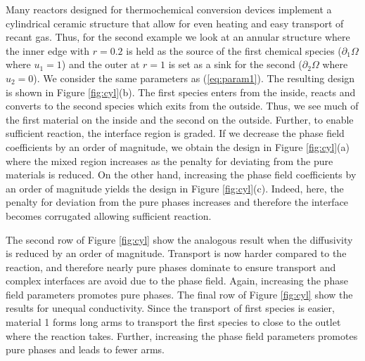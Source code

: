 \documentclass[11pt]{article}
\begin{document}
Many reactors designed for thermochemical conversion devices implement a cylindrical ceramic structure that allow for even heating and easy transport of recant gas. Thus, for the second example we look at an annular structure where the inner edge with $r=0.2$ is held as the source of the first chemical species ($\partial_1 \Omega$ where $u_1=1$) and the outer at $r=1$ is set as a sink for the second  ($\partial_2 \Omega$ where $u_2=0$).  We consider the same parameters as (\ref{eq:param1}). The resulting design is shown in Figure \ref{fig:cyl}(b). The first species enters from the inside, reacts and converts to the second species which exits from the outside. Thus, we see much of the first material on the inside and the second on the outside. Further, to enable sufficient reaction, the interface region is graded.  If we decrease the phase field coefficients by an order of magnitude, we obtain the design in Figure \ref{fig:cyl}(a) where the mixed region increases as the penalty for deviating from the pure materials is reduced. On the other hand, increasing the phase field coefficients by an order of magnitude yields the design in Figure \ref{fig:cyl}(c). Indeed, here, the penalty for deviation from the pure phases increases and therefore the interface becomes corrugated allowing sufficient reaction.

The second row of Figure \ref{fig:cyl} show the analogous result when the diffusivity is reduced by an order of magnitude. Transport is now harder compared to the reaction, and therefore nearly pure phases dominate to ensure transport and complex interfaces are avoid due to the phase field.  Again, increasing the phase field parameters promotes pure phases. The final row of Figure \ref{fig:cyl} show the results for unequal conductivity. Since the transport of first species is easier, material 1 forms long arms to transport the first species to close to the outlet where the reaction takes. Further, increasing the phase field parameters promotes pure phases and leads to fewer arms.

\end{document}
